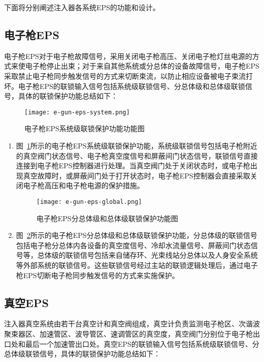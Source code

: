 下面将分别阐述注入器各系统EPS的功能和设计。

\subsection{电子枪EPS}

电子枪EPS对于电子枪故障信号，采用关闭电子枪高压、关闭电子枪灯丝电源的方式来使电子枪停止出束；对于来自其他系统或分总体的设备故障信号，电子枪EPS采取禁止电子枪同步触发信号的方式来切断束流，以防止相应设备被电子束流打坏。电子枪EPS的联锁输入信号包括系统级联锁信号、分总体级和总体级联锁信号，具体的联锁保护功能总结如下：

\begin{figure}[!htb]
	\centering
	\texttt{[image: e-gun-eps-system.png]}
	\caption{电子枪EPS系统级联锁保护功能功能图}
	\label{fig:e-gun-eps-system}
\end{figure}

\begin{enumerate}
  \item 图~\ref{fig:e-gun-eps-system}所示的电子枪EPS系统级联锁保护功能，系统级联锁信号包括电子枪附近的真空阀门状态信号、电子枪真空度信号和屏蔽间门状态信号，联锁信号直接连接到电子枪EPS控制器进行处理。当真空阀门处于关闭状态时，或电子枪出现真空故障时，或屏蔽间门处于打开状态时，电子枪EPS控制器会直接采取关闭电子枪高压和电子枪电源的保护措施。

   \begin{figure}[!htb]
	\centering
	\texttt{[image: e-gun-eps-global.png]}
	\caption{电子枪EPS分总体级和总体级联锁保护功能图}
	\label{fig:e-gun-eps-global}
\end{figure}
 
  \item 图~\ref{fig:e-gun-eps-global}所示的电子枪EPS分总体级和总体级联锁保护功能，分总体级的联锁信号包括电子枪分总体内各设备的真空度信号、冷却水流量信号、屏蔽间门状态信号等，总体级的联锁信号包括来自储存环、光束线站分总体以及人身安全系统等外部系统的联锁信号。这些联锁信号经过主站的联锁逻辑处理后，通过电子枪EPS切断电子枪同步触发信号的方式来实施保护。

\end{enumerate}

\subsection{真空EPS}
注入器真空系统由若干台真空计和真空阀组成，真空计负责监测电子枪区、次谐波聚束器区、加速管区、波导管区、速调管区的真空度，真空阀门分别位于电子枪出口处和最后一个加速管出口处。真空EPS的联锁输入信号包括系统级联锁信号、分总体级联锁信号，具体的联锁保护功能总结如下：


